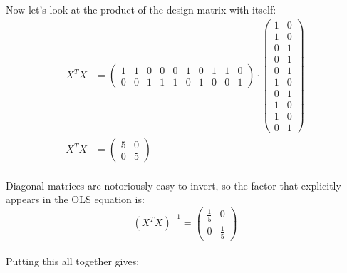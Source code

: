 Now let's look at the product of the design matrix with itself:
\begin{align}
X^T X &=
\left(\begin{array}{cccccccccc}
          1 & 1 & 0 & 0 & 0 & 1 & 0 & 1 & 1 & 0 \\
          0 & 0 & 1 & 1 & 1 & 0 & 1 & 0 & 0 & 1
\end{array}\right)
\cdot
\left(\begin{array}{cc}
          1  &  0 \\ 
          1  &  0 \\ 
          0  &  1 \\ 
          0  &  1 \\ 
          0  &  1 \\ 
          1  &  0 \\ 
          0  &  1 \\ 
          1  &  0 \\ 
          1  &  0 \\ 
          0  &  1
\end{array}\right)
\\
X^T X &=
\left(\begin{array}{cc}
          5 & 0 \\
          0 & 5 
\end{array}\right)
\end{align}
\\
Diagonal matrices are notoriously easy to invert, so the factor that explicitly
appears in the OLS equation is:
\begin{equation}
(X^T X)^{-1} =  
\left(\begin{array}{cc}
          \frac{1}{5} & 0 \\
          0           & \frac{1}{5} 
\end{array}\right)
\end{equation}
\\
Putting this all together gives:

